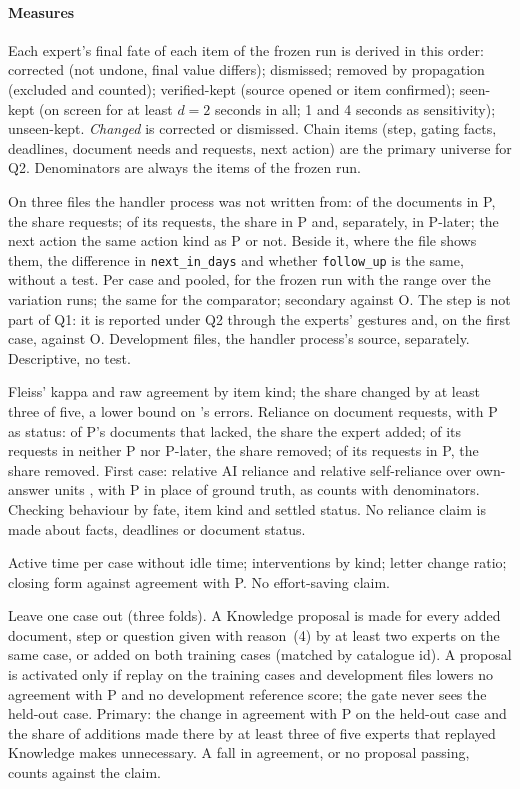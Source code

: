 \paragraph{Measures}
Each expert's final fate of each item of the frozen run is derived in this order: corrected (not undone, final value differs); dismissed; removed by propagation (excluded and counted); verified-kept (source opened or item confirmed); seen-kept (on screen for at least $d=2$ seconds in all; 1 and 4 seconds as sensitivity); unseen-kept. \emph{Changed} is corrected or dismissed. Chain items (step, gating facts, deadlines, document needs and requests, next action) are the primary universe for Q2. Denominators are always the items of the frozen run.
\begin{description}[leftmargin=1em,style=nextline,itemsep=1pt]
\item[Q1, agreement with practice] On three files the handler process was not written from: of the documents in P, the share \casepath requests; of its requests, the share in P and, separately, in P-later; the next action the same action kind as P or not. Beside it, where the file shows them, the difference in \texttt{next\_in\_days} and whether \texttt{follow\_up} is the same, without a test. Per case and pooled, for the frozen run with the range over the variation runs; the same for the comparator; secondary against O. The step is not part of Q1: it is reported under Q2 through the experts' gestures and, on the first case, against O. Development files, the handler process's source, separately. Descriptive, no test.
\item[Q2, five experts on the same items] Fleiss' kappa and raw agreement by item kind; the share changed by at least three of five, a lower bound on \casepath's errors. Reliance on document requests, with P as status: of P's documents that \casepath lacked, the share the expert added; of its requests in neither P nor P-later, the share removed; of its requests in P, the share removed. First case: relative AI reliance and relative self-reliance over own-answer units \cite{schemmer2023appropriate}, with P in place of ground truth, as counts with denominators. Checking behaviour by fate, item kind and settled status. No reliance claim is made about facts, deadlines or document status.
\item[Q3, work] Active time per case without idle time; interventions by kind; letter change ratio; closing form against agreement with P. No effort-saving claim.
\item[Q4, learning] Leave one case out (three folds). A Knowledge proposal is made for every added document, step or question given with reason~(4) by at least two experts on the same case, or added on both training cases (matched by catalogue id). A proposal is activated only if replay on the training cases and development files lowers no agreement with P and no development reference score; the gate never sees the held-out case. Primary: the change in agreement with P on the held-out case and the share of additions made there by at least three of five experts that replayed Knowledge makes unnecessary. A fall in agreement, or no proposal passing, counts against the claim.

\end{description}
